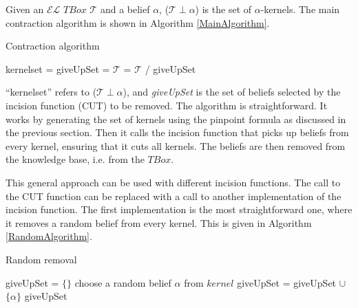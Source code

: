 \documentclass{sfuthesis}
\theoremstyle{plain}
\theoremstyle{definition}
\begin{document}
Given an $\mathcal{EL}$ $TBox$ $\mathcal{T}$ and a belief $\alpha$, ($\mathcal{T} \perp \alpha$) is the set of $\alpha$-kernels. The main contraction algorithm is shown in Algorithm \ref{MainAlgorithm}.

\begin{algorithm}
\caption{Contraction algorithm}
\label{MainAlgorithm}
\begin{algorithmic}[1]
\State kernelset = 
\State giveUpSet = 
\State $\mathcal{T}$ = $\mathcal{T}$ / giveUpSet
\EndProcedure
\end{algorithmic}
\end{algorithm}

``kernelset'' refers to ($\mathcal{T} \perp \alpha$), and \textit{giveUpSet} is the set of beliefs selected by the incision function (CUT) to be removed. The algorithm is straightforward. It works by generating the set of kernels using the pinpoint formula as discussed in the previous section. Then it calls the incision function that picks up beliefs from every kernel, ensuring that it cuts all kernels. The beliefs are then removed from the knowledge base, i.e. from the $TBox$.

This general approach can be used with different incision functions. The call to the CUT function can be replaced with a call to another implementation of the incision function. The first implementation is the most straightforward one, where it removes a random belief from every kernel. This is given in Algorithm \ref{RandomAlgorithm}.

\begin{algorithm}
\caption{Random removal}
\label{RandomAlgorithm}
\begin{algorithmic}[1]
\State giveUpSet = $\lbrace \rbrace$
\State choose a random belief $\alpha$ from $kernel$
\State giveUpSet = giveUpSet $\cup$ $\lbrace \alpha \rbrace$
\EndFor \State
\Return giveUpSet
\EndFunction
\end{algorithmic}
\end{algorithm}
\end{document}
